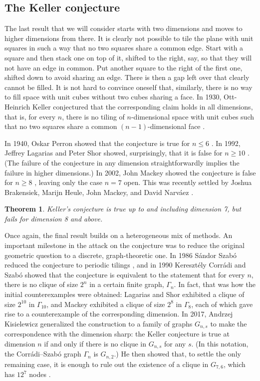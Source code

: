 \documentclass{amsart}
\newtheorem{theorem}{Theorem}[section]
\theoremstyle{definition}
\theoremstyle{remark}
\numberwithin{equation}{section}
\begin{document}
\subsection{The Keller conjecture}

The last result that we will consider starts with two dimensions and moves to higher dimensions from there. It is clearly not possible to tile the plane with unit squares in such a way that no two squares share a common edge. Start with a square and then stack one on top of it, shifted to the right, say, so that they will not have an edge in common. Put another square to the right of the first one, shifted down to avoid sharing an edge. There is then a gap left over that clearly cannot be filled. It is not hard to convince oneself that, similarly, there is no way to fill space with unit cubes without two cubes sharing a face. In 1930, Ott-Heinrich Keller conjectured that the corresponding claim holds in all dimensions, that is, for every $n$, there is no tiling of $n$-dimensional space with unit cubes such that no two squares share a common $(n-1)$-dimensional face \cite{keller:30}.

In 1940, Oskar Perron showed that the conjecture is true for $n \le 6$ \cite{perron:40a,perron:40b}. In 1992, Jeffrey Lagarias and Peter Shor showed, surprisingly, that it is false for $n \ge 10$ \cite{lagarias:shor:92}. (The failure of the conjecture in any dimension straightforwardly implies the failure in higher dimensions.) In 2002, John Mackey showed the conjecture is false for $n \ge 8$ \cite{mackey:02}, leaving only the case $n = 7$ open. This was recently settled by Joshua Brakensiek, Marijn Heule, John Mackey, and David Narv\'aez \cite{brakensiek:et:al:20}.

\begin{theorem}
\label{theorem:keller}
Keller's conjecture is true up to and including dimension 7, but fails for dimension 8 and above.
\end{theorem}

Once again, the final result builds on a heterogeneous mix of methods. An important milestone in the attack on the conjecture was to reduce the original geometric question to a discrete, graph-theoretic one. In 1986 S\'andor Szab\'o reduced the conjecture to periodic tilings \cite{szabo:86}, and in 1990 Kereszt\'ely Corr\'adi and Szab\'o showed that the conjecture is equivalent to the statement that for every $n$, there is no clique of size $2^n$ in a certain finite graph, $\Gamma_n$. In fact, that was how the initial counterexamples were obtained: Lagarias and Shor exhibited a clique of size $2^{10}$ in $\Gamma_{10}$, and Mackey exhibited a clique of size $2^8$ in $\Gamma_{8}$, each of which gave rise to a counterexample of the corresponding dimension. In 2017, Andrzej Kisielewicz generalized the construction to a family of graphs $G_{n, s}$ to make the correspondence with the dimension sharp: the Keller conjecture is true at dimension $n$ if and only if there is no clique in $G_{n, s}$ for any $s$. (In this notation, the Corr\'adi--Szab\'o graph $\Gamma_n$ is $G_{n, 2}$.) He then showed that, to settle the only remaining case, it is enough to rule out the existence of a clique in $G_{7, 6}$, which has $12^7$ nodes \cite{kisielewicz:17}.
\end{document}
